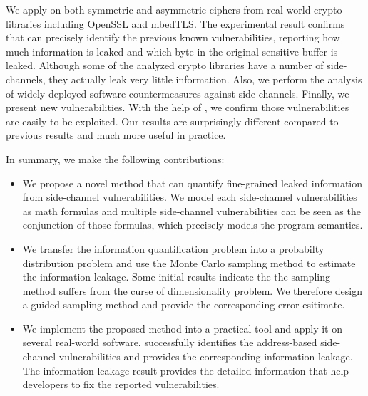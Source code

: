 We apply \tool{} on both symmetric and asymmetric ciphers from real-world crypto libraries including OpenSSL and
mbedTLS. The experimental result confirms that \tool{} can precisely identify the previous known vulnerabilities,
reporting how much information is leaked and which byte in the original sensitive buffer is leaked. 
Although some of the analyzed crypto libraries have a number of side-channels, they actually
leak very little information. Also, we perform the analysis of widely deployed software countermeasures
against side channels.
Finally, we present new vulnerabilities. With the help of \tool{}, we confirm those
vulnerabilities are easily to be exploited. Our results are surprisingly different compared to previous results
and much more useful in practice.

In summary, we make the following contributions:

\begin{itemize}
	\item We propose a novel method that can quantify fine-grained leaked information from side-channel
        vulnerabilities. We model each side-channel vulnerabilities as math formulas and 
        multiple side-channel vulnerabilities can be seen as the conjunction of those formulas, which
        precisely models the program semantics.
        \item We transfer the information quantification problem into a probabilty distribution problem and 
        use the Monte Carlo sampling method to estimate the information leakage. Some initial results indicate the 
        the sampling method suffers from the curse of dimensionality problem. We therefore design a guided
        sampling method and provide the corresponding error esitimate.
	\item We implement the proposed method into a practical tool and apply it on several real-world software. \tool{} 
        successfully identifies the address-based side-channel vulnerabilities and provides the corresponding
        information leakage. The information leakage result provides the detailed information that help developers to
        fix the reported vulnerabilities.
\end{itemize}
